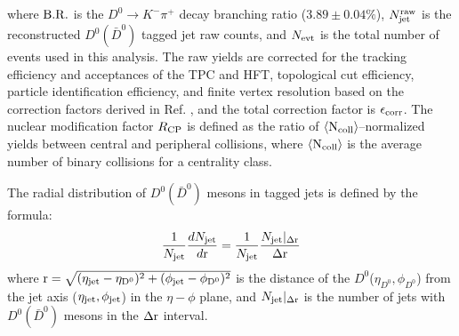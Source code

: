 \documentclass{appolb}
\begin{document}
where $\rm B.R.$ is the $D^{0} \rightarrow K^{-}\pi^{+}$ decay branching ratio ($3.89 \pm 0.04 \%$), $N^{\rm raw}_{\rm jet}$ is the reconstructed $D^{0} (\bar{D}^{0})$ tagged jet raw counts, and $N_{\rm evt}$ is the total number of events used in this analysis. The raw yields are corrected for the tracking efficiency and acceptances of the TPC and HFT, topological cut efficiency, particle identification efficiency, and finite vertex resolution based on the correction factors derived in Ref. \cite{STARD0PaperAuAu}, and the total correction factor is $\epsilon_{\rm corr}$. The nuclear modification factor $R_{\rm CP}$ is defined as the
ratio of $\left\langle\rm N_{\rm coll}\right\rangle$–normalized yields between central and peripheral collisions, where $\left\langle\rm N_{\rm coll}\right\rangle$ is the average number of binary collisions for a centrality class.

The radial distribution of $D^{0} (\bar{D}^{0})$ mesons in tagged jets is defined by the formula:
\begin{equation}
    \frac{1}{N_{\rm jet}}\frac{dN_{\rm jet}}{d\rm r} =  \frac{1}{N_{\rm jet}}\frac{N_{\rm jet}|_{\Delta \rm r}}{\Delta \rm r}
\end{equation}
where $\rm r = \sqrt{(\eta_{\rm jet} - \eta_{D^{0}})^2 + (\phi_{\rm jet} - \phi_{D^{0}})^2}$ is the distance of the $D^{0}$($\eta_{D^{0}}, \phi_{D^{0}}$) from the jet axis ($\eta_{\rm jet}, \phi_{\rm jet}$) in the $\eta-\phi$ plane, and $N_{\rm jet}|_{\Delta \rm r}$ is the number of jets with $D^{0} (\bar{D}^{0})$ mesons in the $\Delta \rm r$ interval.

\end{document}
